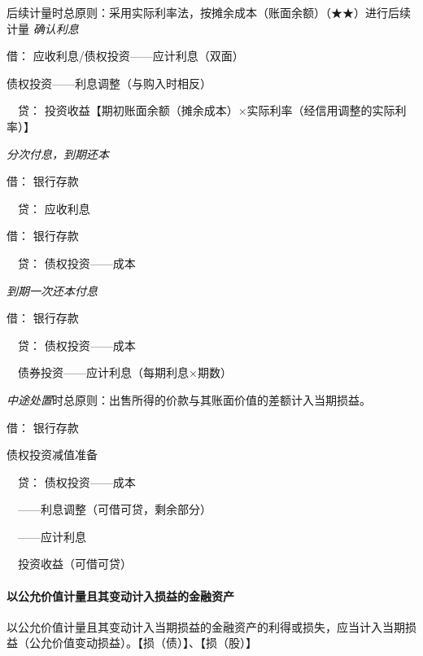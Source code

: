 \documentclass[UTF8,12pt]{ctexart}
\newenvironment{Dr}{\noindent 借：}{\par}
\newenvironment{Cr}{\noindent \ \ 贷：}{\par}
\numberwithin{equation}{section} %
\numberwithin{figure}{section}
\numberwithin{table}{section}
\begin{document}
	后续计量时总原则：采用实际利率法，按摊余成本（账面余额）（★★）进行后续计量
	\textit{确认利息}
	
	\begin{Dr}
		应收利息/债权投资——应计利息（双面）
		
		债权投资——利息调整（与购入时相反）
	\end{Dr}
	\begin{Cr}
		投资收益【期初账面余额（摊余成本）×实际利率（经信用调整的实际利率）】
	\end{Cr}

	\textit{分次付息，到期还本}
	
	\begin{Dr}
		银行存款
	\end{Dr}
	\begin{Cr}
		应收利息
	\end{Cr}
	\begin{Dr}
		银行存款
	\end{Dr}
	\begin{Cr}
		债权投资——成本
	\end{Cr}

	\textit{到期一次还本付息}
	
	\begin{Dr}
		银行存款
	\end{Dr}
	\begin{Cr}
		债权投资——成本
		
		\ \ 债券投资——应计利息（每期利息×期数）
	\end{Cr}
	
	\textit{中途处置}时总原则：出售所得的价款与其账面价值的差额计入当期损益。
	
	\begin{Dr}
		银行存款
		
		债权投资减值准备
	\end{Dr}
	\begin{Cr}
		债权投资——成本
		
		\ \ ——利息调整（可借可贷，剩余部分）
		
		\ \ ——应计利息
		
		\ \ 投资收益（可借可贷）
	\end{Cr}

	
	
	
	\paragraph{以公允价值计量且其变动计入损益的金融资产}
	以公允价值计量且其变动计入当期损益的金融资产的利得或损失，应当计入当期损益（公允价值变动损益）。【损（债）】、【损（股）】
	
\end{document}
